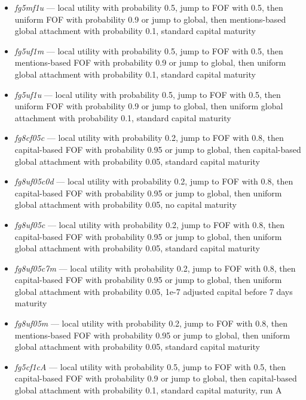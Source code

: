 \documentclass[10pt,oneside]{memoir}
\begin{document}
\begin{itemize}
\item {\itshape fg5mf1u} --- local utility with probability 0.5, jump to FOF with 0.5, then uniform FOF with probability 0.9 or jump to global, then mentions-based global attachment with probability 0.1, standard capital maturity

\item {\itshape fg5uf1m} --- local utility with probability 0.5, jump to FOF with 0.5, then mentions-based FOF with probability 0.9 or jump to global, then uniform global attachment with probability 0.1, standard capital maturity

\item {\itshape fg5uf1u} --- local utility with probability 0.5, jump to FOF with 0.5, then uniform FOF with probability 0.9 or jump to global, then uniform global attachment with probability 0.1, standard capital maturity

\item {\itshape fg8cf05c} --- local utility with probability 0.2, jump to FOF with 0.8, then capital-based FOF with probability 0.95 or jump to global, then capital-based global attachment with probability 0.05, standard capital maturity

\item {\itshape fg8uf05c0d} --- local utility with probability 0.2, jump to FOF with 0.8, then capital-based FOF with probability 0.95 or jump to global, then uniform global attachment with probability 0.05, no capital maturity

\item {\itshape fg8uf05c} --- local utility with probability 0.2, jump to FOF with 0.8, then capital-based FOF with probability 0.95 or jump to global, then uniform global attachment with probability 0.05, standard capital maturity

\item {\itshape fg8uf05c7m} --- local utility with probability 0.2, jump to FOF with 0.8, then capital-based FOF with probability 0.95 or jump to global, then uniform global attachment with probability 0.05, 1e-7 adjusted capital before 7 days maturity

\item {\itshape fg8uf05m} --- local utility with probability 0.2, jump to FOF with 0.8, then mentions-based FOF with probability 0.95 or jump to global, then uniform global attachment with probability 0.05, standard capital maturity

\item {\itshape fg5cf1cA} --- local utility with probability 0.5, jump to FOF with 0.5, then capital-based FOF with probability 0.9 or jump to global, then capital-based global attachment with probability 0.1, standard capital maturity, run A


\end{itemize}
\end{document}
